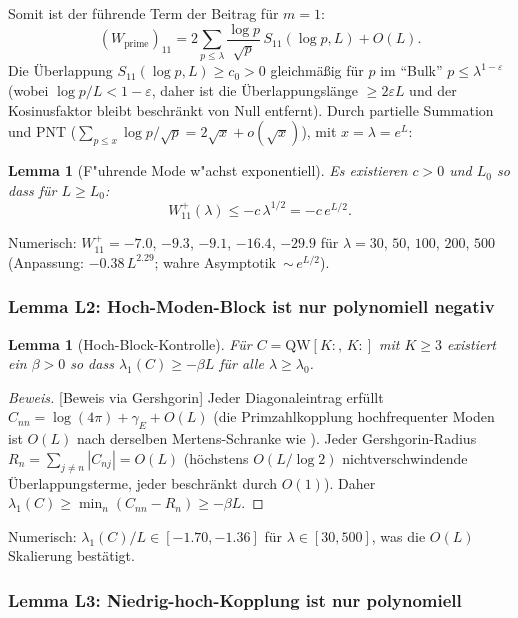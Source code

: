 \documentclass[12pt,a4paper]{article}
\newtheorem{lemma}[theorem]{Lemma}
\theoremstyle{definition}
\theoremstyle{remark}
\begin{document}
Somit ist der führende Term der Beitrag für $m = 1$:
\begin{equation}
\label{eq:W11-m1}
  (W_{\mathrm{prime}})_{11} = 2\sum_{p \leq \lambda} \frac{\log p}{\sqrt{p}}\,S_{11}(\log p, L) + O(L).
\end{equation}
Die Überlappung $S_{11}(\log p, L) \geq c_0 > 0$ gleichmäßig für $p$ im ``Bulk'' $p \leq \lambda^{1-\varepsilon}$ (wobei $\log p / L < 1 - \varepsilon$, daher ist die Überlappungslänge $\geq 2\varepsilon L$ und der Kosinusfaktor bleibt beschränkt von Null entfernt). Durch partielle Summation und PNT ($\sum_{p \leq x} \log p / \sqrt{p} = 2\sqrt{x} + o(\sqrt{x})$), mit $x = \lambda = e^L$:

\begin{lemma}[F"uhrende Mode w"achst exponentiell]
\label{lem:L1}
Es existieren $c > 0$ und $L_0$ so dass für $L \geq L_0$:
\[
  W_{11}^+(\lambda) \leq -c\,\lambda^{1/2} = -c\,e^{L/2}.
\]
\end{lemma}

\noindent Numerisch: $W_{11}^+ = -7.0$, $-9.3$, $-9.1$, $-16.4$, $-29.9$ für $\lambda = 30$, $50$, $100$, $200$, $500$ (Anpassung: $-0.38\,L^{2.29}$; wahre Asymptotik~${\sim}\, e^{L/2}$).

\subsubsection{Lemma L2: Hoch-Moden-Block ist nur polynomiell negativ}

\begin{lemma}[Hoch-Block-Kontrolle]
\label{lem:L2}
Für $C = \mathrm{QW}[K{:},\,K{:}]$ mit $K \geq 3$ existiert ein $\beta > 0$ so dass $\lambda_1(C) \geq -\beta L$ für alle $\lambda \geq \lambda_0$.
\end{lemma}
\begin{proof}[Beweis][Beweis via Gershgorin]
Jeder Diagonaleintrag erfüllt $C_{nn} = \log(4\pi) + \gamma_E + O(L)$ (die Primzahlkopplung hochfrequenter Moden ist $O(L)$ nach derselben Mertens-Schranke wie ). Jeder Gershgorin-Radius $R_n = \sum_{j \neq n} |C_{nj}| = O(L)$ (höchstens $O(L/\log 2)$ nichtverschwindende Überlappungsterme, jeder beschränkt durch $O(1)$). Daher $\lambda_1(C) \geq \min_n(C_{nn} - R_n) \geq -\beta L$.
\end{proof}

\noindent Numerisch: $\lambda_1(C)/L \in [-1.70, -1.36]$ für $\lambda \in [30, 500]$, was die $O(L)$ Skalierung bestätigt.

\subsubsection{Lemma L3: Niedrig-hoch-Kopplung ist nur polynomiell}
\end{document}
